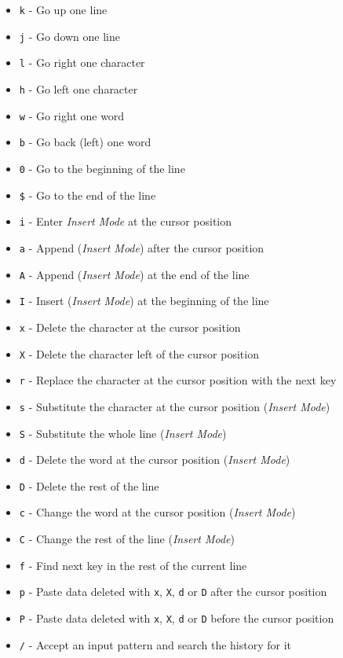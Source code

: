 \begin{itemize}
\item \texttt{k} - Go up one line
\item \texttt{j} - Go down one line
\item \texttt{l} - Go right one character
\item \texttt{h} - Go left one character
\item \texttt{w} - Go right one word
\item \texttt{b} - Go back (left) one word
\item \texttt{0} - Go to the beginning of the line
\item \texttt{\$} - Go to the end of the line
\item \texttt{i} - Enter \emph{Insert Mode} at the cursor position
\item \texttt{a} - Append (\emph{Insert Mode}) after the cursor position
\item \texttt{A} - Append (\emph{Insert Mode}) at the end of the line
\item \texttt{I} - Insert (\emph{Insert Mode}) at the beginning of the line
\item \texttt{x} - Delete the character at the cursor position
\item \texttt{X} - Delete the character left of the cursor position
\item \texttt{r} - Replace the character at the cursor position with the next key
\item \texttt{s} - Substitute the character at the cursor position (\emph{Insert Mode})
\item \texttt{S} - Substitute the whole line (\emph{Insert Mode})
\item \texttt{d} - Delete the word at the cursor position (\emph{Insert Mode})
\item \texttt{D} - Delete the rest of the line
\item \texttt{c} - Change the word at the cursor position (\emph{Insert Mode})
\item \texttt{C} - Change the rest of the line (\emph{Insert Mode})
\item \texttt{f} - Find next key in the rest of the current line
\item \texttt{p} - Paste data deleted with \texttt{x}, \texttt{X}, \texttt{d} or \texttt{D} after the cursor
   position
\item \texttt{P} - Paste data deleted with \texttt{x}, \texttt{X}, \texttt{d} or \texttt{D} before the cursor
   position
\item \texttt{/} - Accept an input pattern and search the history for it

\end{itemize}
